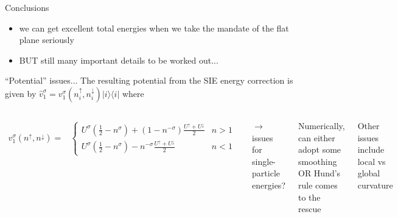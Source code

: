 \documentclass[xcolor=table,aspectratio=169]{beamer}
\newcommand{\bra}[1]{\langle #1|}
\newcommand{\ket}[1]{|#1\rangle}
\numberwithin{equation}{section}
\begin{document}
\begin{frame}{Conclusions}
    \begin{itemize}
        \item we can get excellent total energies when we take the mandate of the flat plane seriously
        \item BUT still many important details to be worked out...
    \end{itemize}

\end{frame}

\begin{frame}{``Potential'' issues...}
    The resulting potential from the SIE energy correction is given by $\hat v^\sigma_1 = v^\sigma_1(n^\uparrow_i, n^\downarrow_i) \ket{i}\bra{i}$ where
    \begin{columns}
        \small
        \begin{align*}
            v^\sigma_1(n^\uparrow, n^\downarrow)
            = &
            \begin{cases}
                U^\sigma\left(\frac{1}{2} - n^\sigma\right)
                + \left(1 - n^{-\sigma}\right)
                \frac{U^\uparrow + U^\downarrow}{2}
                 & n > 1
                \\
                U^\sigma\left(\frac{1}{2} - n^\sigma\right)
                - n^{-\sigma}
                \frac{U^\uparrow + U^\downarrow}{2}
                 & n < 1
            \end{cases}
            \label{eqn:novel_u_potential}
        \end{align*}

        \vspace{6pt}
        $\rightarrow$ issues for single-particle energies?

        \vspace{6pt}
        Numerically, can either adopt some smoothing OR Hund's rule comes to the rescue

        \vspace{6pt}
        Other issues include local vs global curvature


\end{columns}
\end{frame}
\end{document}
